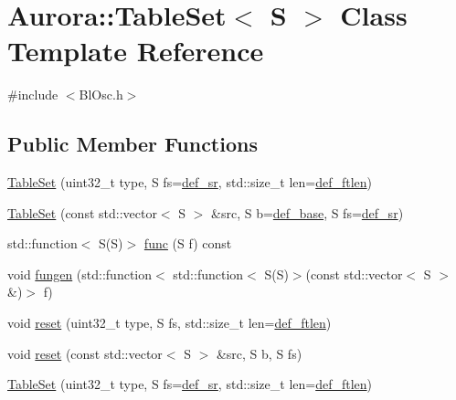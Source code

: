 \hypertarget{class_aurora_1_1_table_set}{}\section{Aurora\+:\+:Table\+Set$<$ S $>$ Class Template Reference}
\label{class_aurora_1_1_table_set}


{\ttfamily \#include $<$Bl\+Osc.\+h$>$}

\subsection*{Public Member Functions}
\begin{DoxyCompactItemize}
\item 
\hyperlink{class_aurora_1_1_table_set_a0be4528b972606335d73ac312da6337b}{Table\+Set} (uint32\+\_\+t type, S fs=\hyperlink{namespace_aurora_ad49263d809bea98dd422e95bc91bc03e}{def\+\_\+sr}, std\+::size\+\_\+t len=\hyperlink{namespace_aurora_a14dabfd9feedfa09c0e6f86d2627f006}{def\+\_\+ftlen})
\item 
\hyperlink{class_aurora_1_1_table_set_a884ecfde480fdac4c32fa10a82286941}{Table\+Set} (const std\+::vector$<$ S $>$ \&src, S b=\hyperlink{namespace_aurora_acb267dff62f74484893c2d5b679b78bf}{def\+\_\+base}, S fs=\hyperlink{namespace_aurora_ad49263d809bea98dd422e95bc91bc03e}{def\+\_\+sr})
\item 
std\+::function$<$ S(S)$>$ \hyperlink{class_aurora_1_1_table_set_a27a325a2c3c4b8cd50e0c86d6ac3c617}{func} (S f) const
\item 
void \hyperlink{class_aurora_1_1_table_set_acd30711601ff6c362253c5d0d9582390}{fungen} (std\+::function$<$ std\+::function$<$ S(S)$>$(const std\+::vector$<$ S $>$ \&)$>$ f)
\item 
void \hyperlink{class_aurora_1_1_table_set_ac2c945c49d53f60fd909dc771a6ff7e5}{reset} (uint32\+\_\+t type, S fs, std\+::size\+\_\+t len=\hyperlink{namespace_aurora_a14dabfd9feedfa09c0e6f86d2627f006}{def\+\_\+ftlen})
\item 
void \hyperlink{class_aurora_1_1_table_set_afec852dca45285ec57b6a4a97dffac36}{reset} (const std\+::vector$<$ S $>$ \&src, S b, S fs)
\item 
\hyperlink{class_aurora_1_1_table_set_a0be4528b972606335d73ac312da6337b}{Table\+Set} (uint32\+\_\+t type, S fs=\hyperlink{namespace_aurora_ad49263d809bea98dd422e95bc91bc03e}{def\+\_\+sr}, std\+::size\+\_\+t len=\hyperlink{namespace_aurora_a14dabfd9feedfa09c0e6f86d2627f006}{def\+\_\+ftlen})

\end{DoxyCompactItemize}
